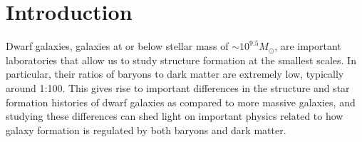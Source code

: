 \documentclass[iop]{emulateapj}
\begin{document}




\section{Introduction}
\label{intro}

Dwarf galaxies, galaxies at or below stellar mass of $\sim 10^{9.5} M_{\odot}$, are important laboratories that allow us to study structure formation at the smallest scales. In particular, their ratios of baryons to dark matter are extremely low, typically around 1:100. This gives rise to important differences in the structure and star formation histories of dwarf galaxies as compared to more massive galaxies, and studying these differences can shed light on important physics related to how galaxy formation is regulated by both baryons and dark matter.
\end{document}
